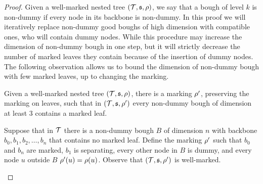 \begin{proof}
Given a well-marked nested tree $(\t, \spt, \marking)$, we say that a bough of level $k$ is non-dummy if every node in its backbone is non-dummy.
In this proof we will iteratively replace non-dummy good boughs of high dimension with compatible ones, who will contain dummy nodes. 
While this procedure may increase the dimension of non-dummy bough in one step, but it will strictly decrease the number of marked leaves they contain because of the insertion of dummy nodes.
The following observation allows us to bound the dimension of non-dummy bough with few marked leaves, up to changing the marking.





\begin{observation} \label{obs:nondummy_leaf}
  Given a well-marked nested tree $(\t, \spt, \marking)$, there is a marking $\rho'$, preserving the marking on leaves, such that in $(\t, \spt, \marking')$ every non-dummy bough of dimension at least $3$ contains a marked leaf. 
\end{observation}

\begin{claimproof}  
  Suppose that in $\t$ there is a non-dummy bough $B$ of dimension $n$ with backbone $b_0,b_1,b_2,\dots, b_n$ that contains no marked leaf. Define the marking $\rho'$ such that $b_0$ and $b_n$ are marked, $b_1$ is separating, every other node in $B$ is dummy, and every node $u$ outside $B$ $\rho'(u) = \rho(u)$. Observe that $(\t, \spt, \marking')$ is well-marked.
\end{claimproof}


\end{proof}
